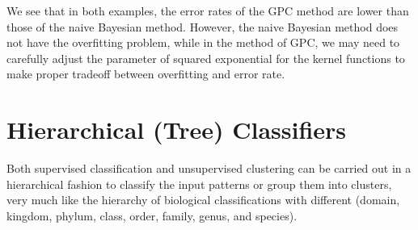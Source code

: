 \documentclass{article}
\begin{document}

We see that in both examples, the error rates of the GPC method are lower
than those of the naive Bayesian method. However, the naive Bayesian method
does not have the overfitting problem, while in the method of GPC, we may 
need to carefully adjust the parameter of squared exponential for the kernel
functions to make proper tradeoff between overfitting and error rate.



\section{Hierarchical (Tree) Classifiers}


Both supervised classification and unsupervised clustering can be carried
out in a hierarchical fashion to classify the input patterns or group them
into clusters, very much like the hierarchy of biological classifications
with different 
(domain, kingdom, phylum, class, order, family, genus, and species). 
\end{document}
